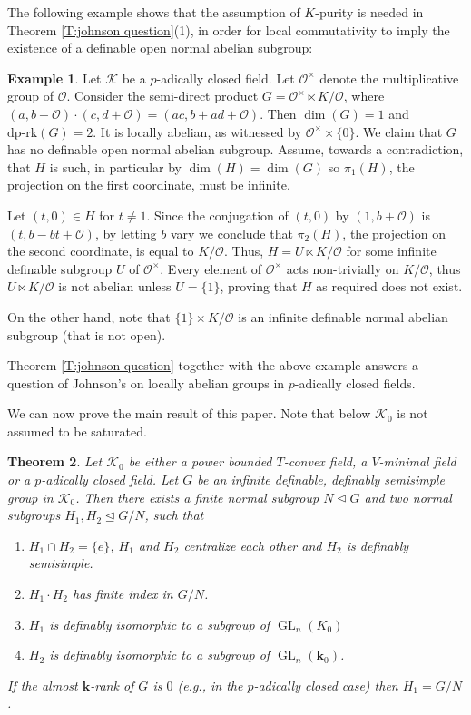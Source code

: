\documentclass[11pt]{amsart}
\DeclareMathOperator{\gl}{GL} \DeclareMathOperator{\agl}{AGL}
\newtheorem{theorem}{Theorem}[section]
\theoremstyle{definition}
\newtheorem{example}[theorem]{Example}
\newcommand{\bk}{\textbf{k}}
\newcommand{\CK}{{\mathcal K}}
\newcommand{\CO}{{\mathcal O}}
\newcommand{\0}{\emptyset}
\def\dpr{\mathrm{dp\text{-}rk}}
\begin{document}
The following example shows that the assumption of $K$-purity is needed in Theorem \ref{T:johnson question}(1), in order for local commutativity to imply the existence of a definable open normal abelian subgroup:


\begin{example}\label{E:counter}
Let $\CK$ be a $p$-adically closed field. Let $\CO^\times$ denote the multiplicative group of $\CO$. Consider the semi-direct product $G=\CO^\times \ltimes K/\CO$, where $(a,b+\CO)\cdot (c,d+\CO)=(ac, b+ad+\CO)$. Then $\dim(G)=1$ and $\dpr(G)=2$. It is locally abelian, as witnessed by $\CO^\times\times \{0\}$. We claim that $G$ has no definable open normal abelian subgroup. Assume, towards a contradiction, that  $H$ is such, in particular by \cite[Theorem 1.4(1)]{JohnTopQp} $\dim(H)=\dim(G)$ so $\pi_1(H)$, the projection on the first coordinate, must be infinite.

Let $(t,0)\in H$ for $t\neq 1$. Since the conjugation of $(t,0)$ by $(1,b+\CO)$ is $(t,b-bt+\CO)$, by letting $b$ vary we conclude that $\pi_2(H)$, the projection on the second coordinate, is equal to $K/\CO$. Thus, $H=U\ltimes K/\CO$ for some infinite definable subgroup $U$ of $\CO^\times$. Every element of $\CO^{\times}$ acts non-trivially on $K/\CO$, thus $U\ltimes K/\CO$ is not abelian unless $U=\{1\}$,  proving that $H$ as required does not exist. 

On the other hand, note that $\{1\}\times K/\CO$ is an infinite definable normal abelian subgroup (that is not open).
\end{example}

Theorem \ref{T:johnson question} together with the above example answers a question of Johnson's \cite[\S 9.3]{JohnTopQp} on locally abelian groups in $p$-adically closed fields. 


We can now prove the main result of this paper. Note that below $\CK_0$ is not assumed to be saturated. 
\begin{theorem}\label{T: main}
    Let $\CK_0$ be either a power bounded $T$-convex field, a $V$-minimal field or a $p$-adically closed field. Let $G$ be an infinite definable, definably semisimple group in $\CK_0$. Then there exists a finite normal subgroup $N\trianglelefteq G$ and two normal subgroups $H_1,H_2\trianglelefteq G/N$, such that 
    \begin{enumerate}
        \item $H_1\cap H_2=\{e\}$, $H_1$ and $H_2$ centralize each other and $H_2$ is definably semisimple.
        \item $H_1\cdot H_2$ has finite index in $G/N$.
        \item $H_1$ is definably isomorphic to a subgroup of $\gl_n(K_0)$
        \item $H_2$ is definably isomorphic to a subgroup of $\gl_n(\bk_0)$.
    \end{enumerate}
If the almost $\bk$-rank of $G$ is $0$ (e.g., in the $p$-adically closed case) then $H_1=G/N$.
\end{theorem}
\end{document}
